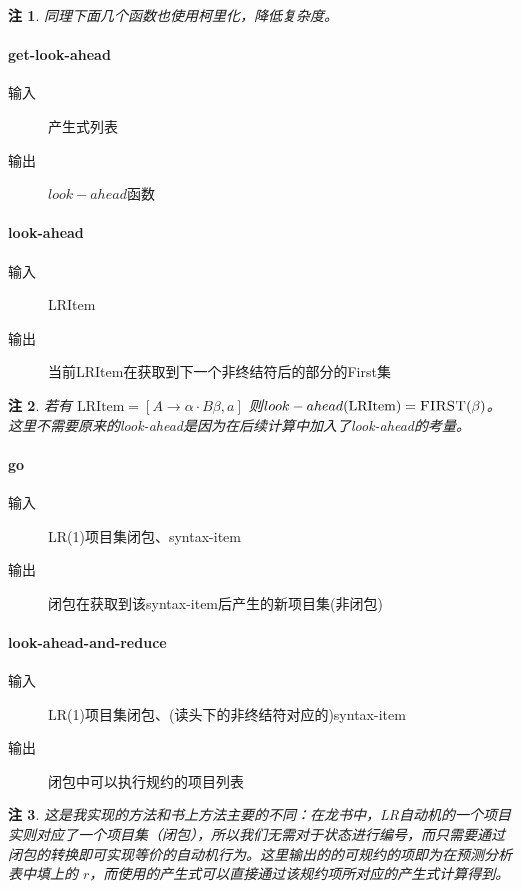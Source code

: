 \documentclass[lang=cn]{ctexart}
\newtheorem{remark}{注}
\begin{document}
{\begin{remark}
	同理下面几个函数也使用柯里化，降低复杂度。
\end{remark}

\paragraph{get-look-ahead}
\begin{description}
	\item[输入] 产生式列表
	\item[输出] $look-ahead$函数
\end{description}

\paragraph{look-ahead}
\begin{description}
	\item[输入] LRItem
	\item[输出] 当前LRItem在获取到下一个非终结符后的部分的First集
\end{description}
\begin{remark}
	若有 $\mathrm{LRItem}= [A\rightarrow \alpha \cdot B \beta, a]$ 则$look-ahead(\mathrm{LRItem}) = \textsc{FIRST}(\beta)$。这里不需要原来的look-ahead是因为在后续计算中加入了look-ahead的考量。
\end{remark}

\paragraph{go}
\begin{description}
	\item[输入] LR(1)项目集闭包、syntax-item
	\item[输出] 闭包在获取到该syntax-item后产生的新项目集(非闭包)
\end{description}

\paragraph{look-ahead-and-reduce}
\begin{description}
	\item[输入] LR(1)项目集闭包、(读头下的非终结符对应的)syntax-item
	\item[输出] 闭包中可以执行规约的项目列表
\end{description}

\begin{remark}
	这是我实现的方法和书上方法主要的不同：在龙书中，LR自动机的一个项目实则对应了一个项目集（闭包），所以我们无需对于状态进行编号，而只需要通过闭包的转换即可实现等价的自动机行为。这里输出的的可规约的项即为在预测分析表中填上的 $r$，而使用的产生式可以直接通过该规约项所对应的产生式计算得到。
\end{remark}

}
\end{document}
